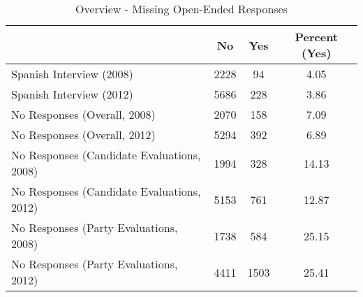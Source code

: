 \begin{table}[ht]
\centering
\begin{tabular}{lccc}
  \hline
 & No & Yes & Percent (Yes) \\ 
  \hline
Spanish Interview (2008) & 2228 & 94 & 4.05 \\ 
  Spanish Interview (2012) & 5686 & 228 & 3.86 \\ 
  No Responses (Overall, 2008) & 2070 & 158 & 7.09 \\ 
  No Responses (Overall, 2012) & 5294 & 392 & 6.89 \\ 
  No Responses (Candidate Evaluations, 2008) & 1994 & 328 & 14.13 \\ 
  No Responses (Candidate Evaluations, 2012) & 5153 & 761 & 12.87 \\ 
  No Responses (Party Evaluations, 2008) & 1738 & 584 & 25.15 \\ 
  No Responses (Party Evaluations, 2012) & 4411 & 1503 & 25.41 \\ 
   \hline
\end{tabular}
\caption{Overview - Missing Open-Ended Responses} 
\label{tab:a1_mis}
\end{table}
